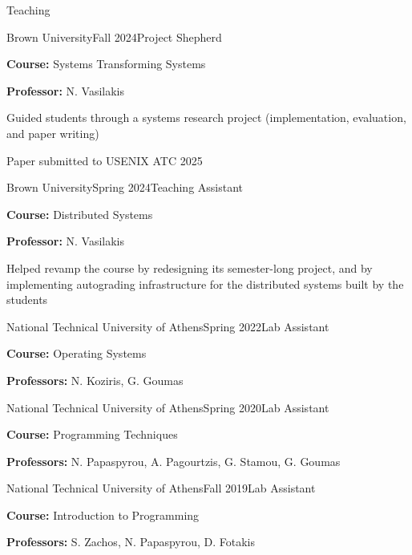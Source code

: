 \documentclass[letterpaper, 12pt]{resume}
\newcommand{\heading}[1]{\textbf{#1:}\xspace}
\begin{document}
\begin{rSection}{Teaching}
    \begin{rSubsection}{Brown University}{Fall 2024}{Project Shepherd}{}
        \item \heading{Course} Systems Transforming Systems
        \item \heading{Professor} N. Vasilakis
        \item Guided students through a systems research project (implementation, evaluation, and paper writing)
        \item Paper submitted to USENIX ATC 2025
    \end{rSubsection}

    \begin{rSubsection}{Brown University}{Spring 2024}{Teaching Assistant}{}
        \item \heading{Course} Distributed Systems
        \item \heading{Professor} N. Vasilakis
        \item Helped revamp the course by redesigning its semester-long project, and by implementing autograding infrastructure for the distributed systems built by the students
    \end{rSubsection}

    \begin{rSubsection}{National Technical University of Athens}{Spring 2022}{Lab Assistant}{}
        \item \heading{Course} Operating Systems
        \item \heading{Professors} N. Koziris, G. Goumas
    \end{rSubsection}

    \begin{rSubsection}{National Technical University of Athens}{Spring 2020}{Lab Assistant}{}
        \item \heading{Course} Programming Techniques
        \item \heading{Professors} N. Papaspyrou, A. Pagourtzis, G. Stamou, G. Goumas
    \end{rSubsection}

    \begin{rSubsection}{National Technical University of Athens}{Fall 2019}{Lab Assistant}{}
        \item \heading{Course} Introduction to Programming
        \item \heading{Professors} S. Zachos, N. Papaspyrou, D. Fotakis
    \end{rSubsection}
\end{rSection}
\end{document}
